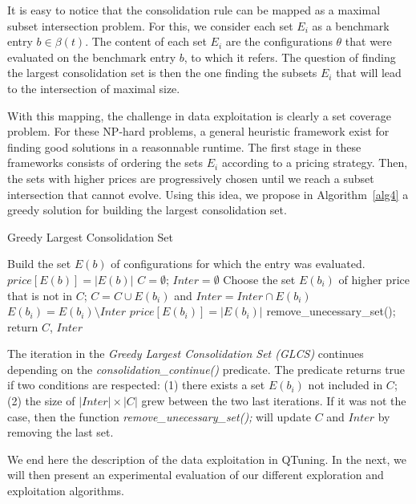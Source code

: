 \documentclass[10pt, conference, compsocconf]{IEEEtran}
\begin{document}
It is easy to notice that the consolidation rule can be mapped as a maximal subset intersection problem. 
For this, we consider each set $E_i$ as a benchmark entry $b \in \beta(t)$. The content of each set $E_i$ are 
the configurations $\theta$ that were evaluated on the benchmark entry $b$, to which it refers. The question of 
finding the largest consolidation set is then the one finding the subsets $E_i$ that will lead to the intersection of maximal 
size.

With this mapping, the challenge in data exploitation is clearly a set coverage problem. For these NP-hard problems, 
a general heuristic framework exist for finding good solutions in a reasonnable runtime. The first stage in these frameworks 
consists of ordering the sets $E_i$ according to a pricing strategy. Then, the sets with higher prices are progressively 
chosen until we reach a subset intersection that cannot evolve. Using this idea, we propose in Algorithm~\ref{alg4} 
a greedy solution for building the largest consolidation set.

	\begin{algorithm}                    
	\caption{\scriptsize Greedy Largest Consolidation Set} 	\label{alg4}  
	\begin{algorithmic}[1]
	\scriptsize
	\STATE Build the set $E(b)$ of configurations for which the entry was evaluated.
	\STATE $price[E(b)] = |E(b)|$
	\ENDFOR
	\STATE $C = \emptyset$; $Inter = \emptyset$
		\STATE Choose the set $E(b_i)$ of higher price that is not in $C$;
		\STATE $C  = C \cup E(b_i)$ and $Inter = Inter \cap E(b_i)$
			\STATE $E(b_i) = E(b_i) \setminus Inter$
			\STATE $price[E(b_i)] = |E(b_i)|$
		\ENDFOR
	\ENDWHILE
	\STATE remove\_unecessary\_set();
	\STATE return $C$, $Inter$
	\end{algorithmic}
	\end{algorithm}
	\normalsize

The iteration in the {\it Greedy Largest Consolidation Set (GLCS)} continues depending on 
the  {\it consolidation\_continue()} predicate. The predicate returns true if two conditions are 
respected: (1) there exists a set $E(b_i)$ not included in $C$; (2) the size of $|Inter| \times |C|$ grew 
between the two last iterations. If it was not the case, then the function {\it remove\_unecessary\_set();} 
will update $C$ and $Inter$ by removing the last set. 

We end here the description of the data exploitation in QTuning. In the next, we will then present an 
experimental evaluation of our different exploration and exploitation algorithms.
\end{document}
